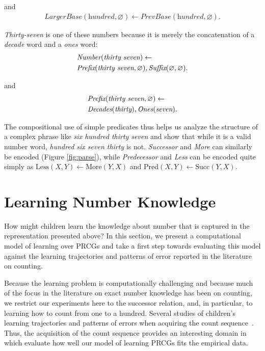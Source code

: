\documentclass[10pt,letterpaper]{article}
\begin{document}
\noindent and
\begin{align}
  \textit{LargerBase}(\textit{hundred}, \varnothing) \leftarrow \textit{PrevBase}(\textit{hundred}, \varnothing).
\end{align}

\noindent\emph{Thirty-seven} is one of these numbers because it is
merely the concatenation of a \emph{decade} word and a \emph{ones}
word:
\begin{align}
  & \textit{Number}(\textit{thirty seven}) \leftarrow\\
  & \textit{Prefix}(\textit{thirty seven}, \varnothing), \textit{Suffix}(\varnothing,\varnothing).\notag
\end{align}

\noindent and
\begin{align}
  & \textit{Prefix}(\textit{thirty seven}, \varnothing) \leftarrow\\
  & \textit{Decades}(\textit{thirty}), \textit{Ones}(\textit{seven}).\notag
\end{align}


\noindent The compositional use of simple predicates thus helps us
analyze the structure of a complex phrase like \emph{six hundred
  thirty seven} and show that while it is a valid number word,
\emph{hundred six seven thirty} is not. \emph{Successor} and
\emph{More} can similarly be encoded (Figure \ref{fig:parse}), while
\emph{Predecessor} and \emph{Less} can be encoded quite simply as
$\text{Less}(X,Y) \leftarrow \text{More}(Y,X)$ and $\text{Pred}(X,Y)
\leftarrow \text{Succ}(Y,X)$.

\section{Learning Number Knowledge}

How might children learn the knowledge about number that is captured
in the representation presented above? In this section, we present a
computational model of learning over PRCGs and take a first step
towards evaluating this model against the learning trajectories and
patterns of error reported in the literature on counting. 

Because the learning problem is computationally challenging and
because much of the focus in the literature on exact number knowledge
has been on counting, we restrict our experiments here to the
successor relation, and, in particular, to learning how to count from
one to a hundred. Several studies of children's learning trajectories
and patterns of errors when acquiring the count
sequence~\citep{FusRicBriar1982,miller1987counting}. Thus, the
acquisition of the count sequence provides an interesting domain in
which evaluate how well our model of learning PRCGs fits the empirical
data.
\end{document}
